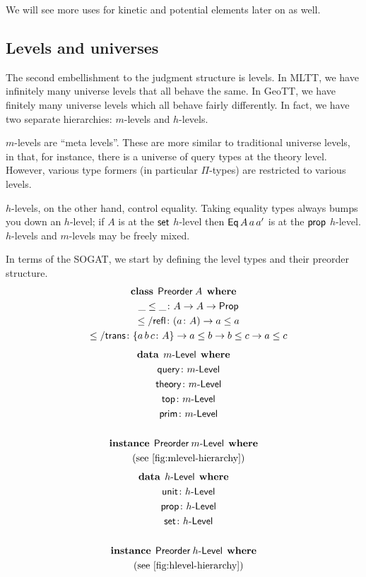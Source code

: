 \documentclass[fleqn,leqno]{article}
\begin{document}
We will see more uses for kinetic and potential elements later on as well.

\subsection{Levels and universes}

The second embellishment to the judgment structure is levels. In MLTT, we have infinitely many universe levels that all behave the same. In GeoTT, we have finitely many universe levels which all behave fairly differently. In fact, we have two separate hierarchies: $m$-levels and $h$-levels.

$m$-levels are ``meta levels''. These are more similar to traditional universe levels, in that, for instance, there is a universe of query types at the theory level. However, various type formers (in particular $\Pi$-types) are restricted to various levels.

$h$-levels, on the other hand, control equality. Taking equality types always bumps you down an $h$-level; if $A$ is at the $\mathsf{set}$ $h$-level then $\mathsf{Eq}\,A\,a\,a'$ is at the $\mathsf{prop}$ $h$-level. $h$-levels and $m$-levels may be freely mixed.

In terms of the SOGAT, we start by defining the level types and their preorder structure.
\begin{gather}
  \mathbf{class}\:\:\mathsf{Preorder}\:A\:\:\mathbf{where} \\
  \quad \_\leq\_ \colon A \to A \to \mathsf{Prop} \\
  \quad \leq/\mathsf{refl} \colon (a \colon A) \to a \leq a \\
  \quad \leq/\mathsf{trans} \colon \{a\,b\,c \colon A\} \to a \leq b \to b \leq c \to a \leq c
\end{gather}
\begin{gather}
  \mb{data}\:\:\mLevel\:\:\mb{where} \\
  \quad \ms{query} \colon \mLevel \\
  \quad \ms{theory} \colon \mLevel \\
  \quad \ms{top} \colon \mLevel \\
  \quad \ms{prim} \colon \mLevel \\
  \\
  \mb{instance}\:\:\ms{Preorder}\:\mLevel\:\:\mb{where} \\
  \quad \text{(see \cref{fig:mlevel-hierarchy})}
\end{gather}
\begin{gather}
  \mb{data}\:\:\hLevel\:\:\mb{where} \\
  \quad \ms{unit} \colon \hLevel \\
  \quad \ms{prop} \colon \hLevel \\
  \quad \ms{set} \colon \hLevel \\
  \\
  \mb{instance}\:\:\ms{Preorder}\:\hLevel\:\:\mb{where} \\
  \quad \text{(see \cref{fig:hlevel-hierarchy})}
\end{gather}
\end{document}
